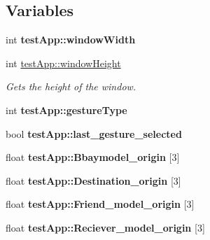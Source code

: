 \subsection*{Variables}
\begin{DoxyCompactItemize}
\item 
\hypertarget{group___int_variables_ga9ed611377cd46f5148a3a3d538e96484}{int {\bfseries test\-App\-::window\-Width}}\label{group___int_variables_ga9ed611377cd46f5148a3a3d538e96484}

\item 
int \hyperlink{group___int_variables_ga31efaa85f8a900bb659a537d56c73e03}{test\-App\-::window\-Height}
\begin{DoxyCompactList}\small\item\em Gets the height of the window. \end{DoxyCompactList}\item 
\hypertarget{group___int_variables_ga0db6626782419f4340a3186e51788074}{int {\bfseries test\-App\-::gesture\-Type}}\label{group___int_variables_ga0db6626782419f4340a3186e51788074}

\item 
\hypertarget{group___int_variables_ga75ac9dc8ee1df4ae07b93a9b74131924}{bool {\bfseries test\-App\-::last\-\_\-gesture\-\_\-selected}}\label{group___int_variables_ga75ac9dc8ee1df4ae07b93a9b74131924}

\item 
\hypertarget{group___int_variables_gade2979b7d56a0c511c43eb9d9d12e2c2}{float {\bfseries test\-App\-::\-Bbaymodel\-\_\-origin} \mbox{[}3\mbox{]}}\label{group___int_variables_gade2979b7d56a0c511c43eb9d9d12e2c2}

\item 
\hypertarget{group___int_variables_ga512ac027aa350f45373993d9d8e5dfa7}{float {\bfseries test\-App\-::\-Destination\-\_\-origin} \mbox{[}3\mbox{]}}\label{group___int_variables_ga512ac027aa350f45373993d9d8e5dfa7}

\item 
\hypertarget{group___int_variables_ga3fab0780528ef0bc89cc2b6cd9257576}{float {\bfseries test\-App\-::\-Friend\-\_\-model\-\_\-origin} \mbox{[}3\mbox{]}}\label{group___int_variables_ga3fab0780528ef0bc89cc2b6cd9257576}

\item 
\hypertarget{group___int_variables_gaf498dc916fbd788322d3a49f71f322c5}{float {\bfseries test\-App\-::\-Reciever\-\_\-model\-\_\-origin} \mbox{[}3\mbox{]}}\label{group___int_variables_gaf498dc916fbd788322d3a49f71f322c5}


\end{DoxyCompactItemize}
